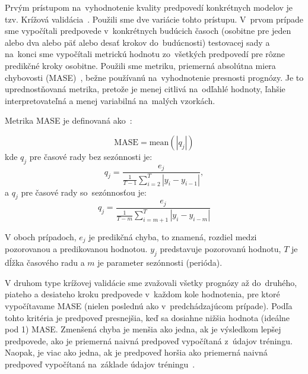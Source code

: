 \documentclass[thesismargins, thesislinespacing, openright, upjsfrontpage]{rnthesis}
\begin{document}

Prvým prístupom na~vyhodnotenie kvality predpovedí konkrétnych modelov je tzv. Krížová validácia~\cite {hyndman2018forecasting}. Použili sme dve variácie tohto prístupu. V~prvom prípade sme vypočítali predpovede v~konkrétnych budúcich časoch (osobitne pre jeden alebo dva alebo päť alebo desať krokov do~budúcnosti) testovacej sady a na~konci sme vypočítali metrickú hodnotu zo~všetkých predpovedí pre rôzne predikčné kroky osobitne. Použili sme metriku, priemerná absolútna miera chybovosti (MASE)~\cite{hyndman2006another}, bežne používanú na~vyhodnotenie presnosti prognózy.
Je to uprednostňovaná metrika, pretože je menej citlivá na~odľahlé hodnoty, ľahšie interpretovateľná a menej variabilná na~malých vzorkách.

Metrika MASE je definovaná ako~\cite{hyndman2018forecasting}:

% 
\begin{equation}
\textrm{MASE} = \textrm{mean}(|q_j|)
\end{equation}
% 
kde $q_j$ pre časové rady bez sezónnosti je:
% 
\begin{equation} 
q_j= \frac{e_j}{\frac{1}{T-1} \sum_{i=2}^{T}|y_i - y_{i-1}|},
\end{equation}
% 
a $q_j$ pre časové rady so~sezónnosťou je:
% 
\begin{equation} 
q_j = \frac{e_j}{\frac{1}{T-m} \sum_{i=m+1}^{T}|y_i - y_{i-m}|}
\end{equation}

V oboch prípadoch, $e_j$ je predikčná chyba, to znamená, rozdiel medzi pozorovanou a predikovanou hodnotou. $y_j$ predstavuje pozorovanú hodnotu, $T$ je dĺžka časového radu a $m$ je parameter sezónnosti (perióda).

V druhom type krížovej validácie sme zvažovali všetky prognózy až do~druhého, piateho a desiateho kroku predpovede v~každom kole hodnotenia, pre ktoré vypočítavame MASE (nielen poslednú ako v~predchádzajúcom prípade). Podľa tohto kritéria je predpoveď presnejšia, keď sa dosiahne nižšia hodnota (ideálne pod 1) MASE. Zmenšená chyba je menšia ako jedna, ak je výsledkom lepšej predpovede, ako je priemerná naivná predpoveď vypočítaná z~údajov tréningu. Naopak, je viac ako jedna, ak je predpoveď horšia ako priemerná naivná predpoveď vypočítaná na~základe údajov tréningu~\cite{hyndman2014measuring}.
\end{document}
